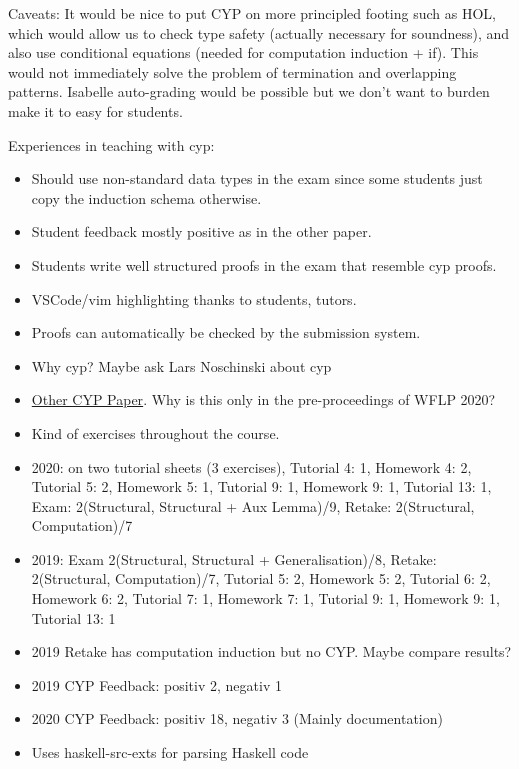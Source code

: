 Caveats:
It would be nice to put CYP on more principled footing such as HOL, which would allow us to check type safety (actually necessary for soundness), and also use conditional equations (needed for computation induction + if).
This would not immediately solve the problem of termination and overlapping patterns.
Isabelle auto-grading would be possible but we don't want to burden make it to easy for students.

Experiences in teaching with cyp:
\begin{itemize}
    \item Should use non-standard data types in the exam since some students just copy the induction schema otherwise.
    \item Student feedback mostly positive as in the other paper.
    \item Students write well structured proofs in the exam that resemble cyp proofs.
    \item VSCode/vim highlighting thanks to students, tutors.
    \item Proofs can automatically be checked by the submission system.
\end{itemize}

\begin{itemize}
  \item Why cyp? Maybe ask Lars Noschinski about cyp
  \item \href{https://arxiv.org/pdf/2009.01326.pdf}{Other CYP Paper}. Why is this only in the pre-proceedings of WFLP 2020?
  \item Kind of exercises throughout the course.
  \item 2020: on two tutorial sheets (3 exercises), Tutorial 4: 1, Homework 4: 2, Tutorial 5: 2, Homework 5: 1, Tutorial 9: 1, Homework 9: 1, Tutorial 13: 1, Exam: 2(Structural, Structural + Aux Lemma)/9, Retake: 2(Structural, Computation)/7
  \item 2019: Exam 2(Structural, Structural + Generalisation)/8, Retake: 2(Structural, Computation)/7, Tutorial 5: 2, Homework 5: 2, Tutorial 6: 2, Homework 6: 2, Tutorial 7: 1, Homework 7: 1, Tutorial 9: 1, Homework 9: 1, Tutorial 13: 1
  \item 2019 Retake has computation induction but no CYP. Maybe compare results?
  \item 2019 CYP Feedback: positiv 2, negativ 1
  \item 2020 CYP Feedback: positiv 18, negativ 3 (Mainly documentation)
  \item Uses haskell-src-exts for parsing Haskell code
\end{itemize}
